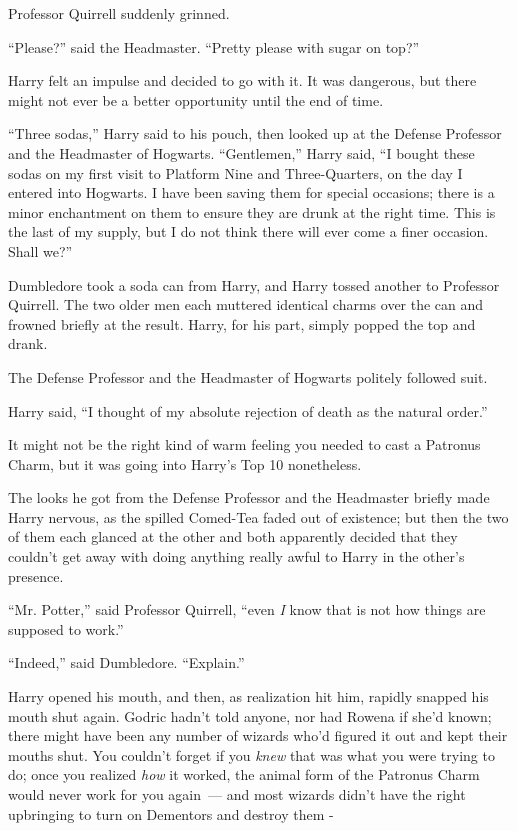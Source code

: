 Professor Quirrell suddenly grinned.

``Please?'' said the Headmaster. ``Pretty please with sugar on top?''

Harry felt an impulse and decided to go with it. It was dangerous, but there might not ever be a better opportunity until the end of time.

``Three sodas,'' Harry said to his pouch, then looked up at the Defense Professor and the Headmaster of Hogwarts. ``Gentlemen,'' Harry said, ``I bought these sodas on my first visit to Platform Nine and Three-Quarters, on the day I entered into Hogwarts. I have been saving them for special occasions; there is a minor enchantment on them to ensure they are drunk at the right time. This is the last of my supply, but I do not think there will ever come a finer occasion. Shall we?''

Dumbledore took a soda can from Harry, and Harry tossed another to Professor Quirrell. The two older men each muttered identical charms over the can and frowned briefly at the result. Harry, for his part, simply popped the top and drank.

The Defense Professor and the Headmaster of Hogwarts politely followed suit.

Harry said, ``I thought of my absolute rejection of death as the natural order.''

It might not be the right kind of warm feeling you needed to cast a Patronus Charm, but it was going into Harry's Top 10 nonetheless.

The looks he got from the Defense Professor and the Headmaster briefly made Harry nervous, as the spilled Comed-Tea faded out of existence; but then the two of them each glanced at the other and both apparently decided that they couldn't get away with doing anything really awful to Harry in the other's presence.

``Mr. Potter,'' said Professor Quirrell, ``even \emph{I} know that is not how things are supposed to work.''

``Indeed,'' said Dumbledore. ``Explain.''

Harry opened his mouth, and then, as realization hit him, rapidly snapped his mouth shut again. Godric hadn't told anyone, nor had Rowena if she'd known; there might have been any number of wizards who'd figured it out and kept their mouths shut. You couldn't forget if you \emph{knew} that was what you were trying to do; once you realized \emph{how} it worked, the animal form of the Patronus Charm would never work for you again~--- and most wizards didn't have the right upbringing to turn on Dementors and destroy them -

